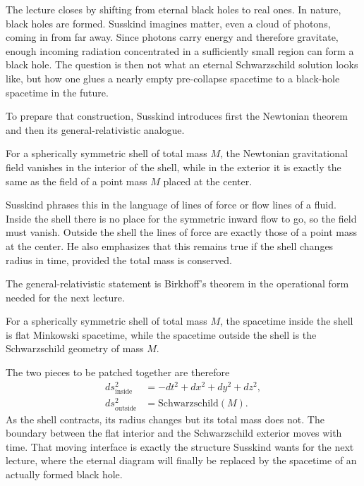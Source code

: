 The lecture closes by shifting from eternal black holes to real ones. In nature, black holes are formed. Susskind imagines matter, even a cloud of photons, coming in from far away. Since photons carry energy and therefore gravitate, enough incoming radiation concentrated in a sufficiently small region can form a black hole. The question is then not what an eternal Schwarzschild solution looks like, but how one glues a nearly empty pre-collapse spacetime to a black-hole spacetime in the future.

To prepare that construction, Susskind introduces first the Newtonian theorem and then its general-relativistic analogue.

\begin{proposition}
For a spherically symmetric shell of total mass \(M\), the Newtonian gravitational field vanishes in the interior of the shell, while in the exterior it is exactly the same as the field of a point mass \(M\) placed at the center.
\end{proposition}

Susskind phrases this in the language of lines of force or flow lines of a fluid. Inside the shell there is no place for the symmetric inward flow to go, so the field must vanish. Outside the shell the lines of force are exactly those of a point mass at the center. He also emphasizes that this remains true if the shell changes radius in time, provided the total mass is conserved.

The general-relativistic statement is Birkhoff's theorem in the operational form needed for the next lecture.

\begin{theorem}
For a spherically symmetric shell of total mass \(M\), the spacetime inside the shell is flat Minkowski spacetime, while the spacetime outside the shell is the Schwarzschild geometry of mass \(M\).
\end{theorem}

The two pieces to be patched together are therefore
\begin{align}
ds^2_{\text{inside}} &= -dt^2+dx^2+dy^2+dz^2,\\
ds^2_{\text{outside}} &= \text{Schwarzschild}(M).
\end{align}
As the shell contracts, its radius changes but its total mass does not. The boundary between the flat interior and the Schwarzschild exterior moves with time. That moving interface is exactly the structure Susskind wants for the next lecture, where the eternal diagram will finally be replaced by the spacetime of an actually formed black hole.

